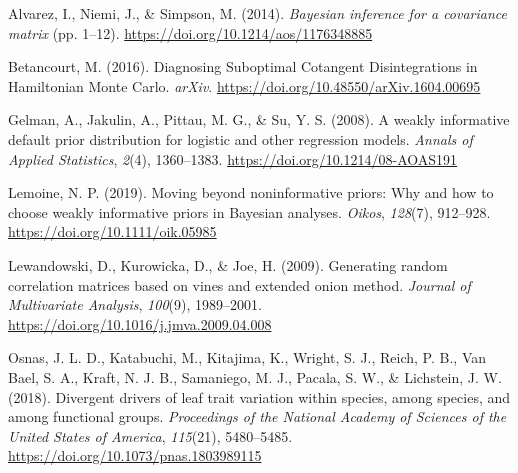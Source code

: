 \documentclass[
  12pt,
  letterpaper,
  DIV=11,
  numbers=noendperiod]{scrartcl}
\newlength{\cslhangindent}
\newlength{\cslentryspacingunit} %
\newenvironment{CSLReferences}[2] %
 {%
  \setlength{\parindent}{0pt}
  \ifodd #1
  \let\oldpar\par
  \def\par{\hangindent=\cslhangindent\oldpar}
  \fi
  \setlength{\parskip}{#2\cslentryspacingunit}
 }%
 {}
\begin{document}
\hypertarget{refs}{}
\begin{CSLReferences}{1}{0}
\leavevmode{}%
Alvarez, I., Niemi, J., \& Simpson, M. (2014). \emph{Bayesian inference
for a covariance matrix} (pp. 1--12).
\url{https://doi.org/10.1214/aos/1176348885}

\leavevmode{}%
Betancourt, M. (2016). Diagnosing {Suboptimal Cotangent Disintegrations}
in {Hamiltonian Monte Carlo}. \emph{arXiv}.
\url{https://doi.org/10.48550/arXiv.1604.00695}

\leavevmode{}%
Gelman, A., Jakulin, A., Pittau, M. G., \& Su, Y. S. (2008). A weakly
informative default prior distribution for logistic and other regression
models. \emph{Annals of Applied Statistics}, \emph{2}(4), 1360--1383.
\url{https://doi.org/10.1214/08-AOAS191}

\leavevmode{}%
Lemoine, N. P. (2019). Moving beyond noninformative priors: Why and how
to choose weakly informative priors in {Bayesian} analyses.
\emph{Oikos}, \emph{128}(7), 912--928.
\url{https://doi.org/10.1111/oik.05985}

\leavevmode{}%
Lewandowski, D., Kurowicka, D., \& Joe, H. (2009). Generating random
correlation matrices based on vines and extended onion method.
\emph{Journal of Multivariate Analysis}, \emph{100}(9), 1989--2001.
\url{https://doi.org/10.1016/j.jmva.2009.04.008}

\leavevmode{}%
Osnas, J. L. D., Katabuchi, M., Kitajima, K., Wright, S. J., Reich, P.
B., Van Bael, S. A., Kraft, N. J. B., Samaniego, M. J., Pacala, S. W.,
\& Lichstein, J. W. (2018). Divergent drivers of leaf trait variation
within species, among species, and among functional groups.
\emph{Proceedings of the National Academy of Sciences of the United
States of America}, \emph{115}(21), 5480--5485.
\url{https://doi.org/10.1073/pnas.1803989115}

\end{CSLReferences}
\end{document}
